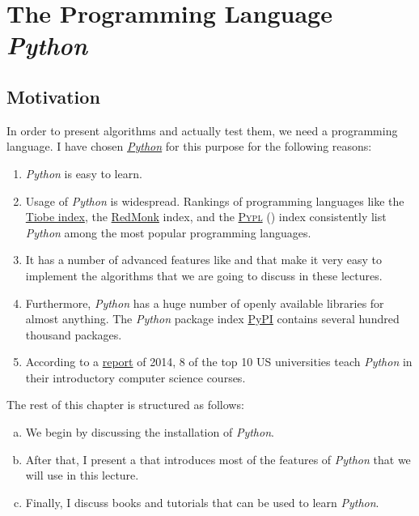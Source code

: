 \chapter{The Programming Language \textsl{Python}}
\section{Motivation}
In order to present algorithms and actually test them, we need a programming language.  I have chosen
\href{http://www.python.org}{\textsl{Python}} for this purpose for the following reasons:
\begin{enumerate}
\item \textsl{Python} is easy to learn.
\item Usage of \textsl{Python} is widespread.  Rankings of programming languages like the
      \href{https://www.tiobe.com/tiobe-index/}{Tiobe index}, the \href{https://redmonk.com/}{RedMonk} index,
      and the \href{https://pypl.github.io/PYPL.html}{\textsc{Pypl}} ()
      index consistently list \textsl{Python} among the most popular programming languages.
\item It has a number of advanced features like  and  that make it very easy to
      implement the algorithms that we are going to discuss in these lectures.
\item Furthermore, \textsl{Python} has a huge number of openly available libraries for almost anything.
      The \textsl{Python} package index \href{https://pypi.org}{PyPI} contains several hundred thousand
      packages.
\item According to a
      \href{https://cacm.acm.org/blogs/blog-cacm/176450-python-is-now-the-most-popular-introductory-teaching-language-at-top-u-s-universities/fulltext}{report} 
      of 2014, 8 of the top 10 US universities teach \textsl{Python} in their introductory computer science courses.
\end{enumerate}
The rest of this chapter is structured as follows:
\begin{enumerate}[(a)]
\item We begin by discussing the installation of \textsl{Python}.
\item After that, I present a \textsl{} that introduces most of the features of
      \textsl{Python} that we will use in this lecture.
\item Finally, I discuss books and tutorials that can be used to learn \textsl{Python}.  
\end{enumerate}

